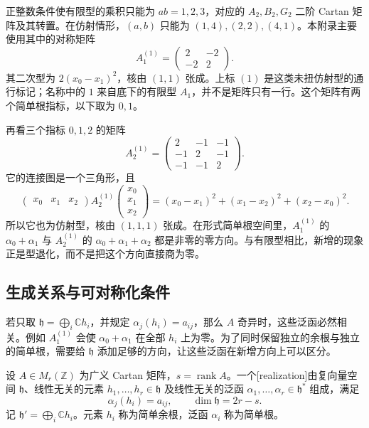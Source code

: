 正整数条件使有限型的乘积只能为 \(ab=1,2,3\)，对应的 \(A_2,B_2,G_2\) 二阶 Cartan 矩阵及其转置。在仿射情形，\((a,b)\) 只能为 \((1,4),(2,2),(4,1)\)。本附录主要使用其中的对称矩阵
\[
	A_1^{(1)}=\begin{pmatrix}2&-2\\-2&2\end{pmatrix}.
\]
其二次型为 \(2(x_0-x_1)^2\)，核由 \((1,1)\) 张成。上标 \((1)\) 是这类未扭仿射型的通行标记；名称中的 \(1\) 来自底下的有限型 \(A_1\)，并不是矩阵只有一行。这个矩阵有两个简单根指标，以下取为 \(0,1\)。

\ProseParagraphBreak

再看三个指标 \(0,1,2\) 的矩阵
\[
	A_2^{(1)}=\begin{pmatrix}2&-1&-1\\-1&2&-1\\-1&-1&2\end{pmatrix}.
\]
它的连接图是一个三角形，且
\[
	\begin{pmatrix}x_0&x_1&x_2\end{pmatrix}A_2^{(1)}
	\begin{pmatrix}x_0\\x_1\\x_2\end{pmatrix}
	=(x_0-x_1)^2+(x_1-x_2)^2+(x_2-x_0)^2.
\]
所以它也为仿射型，核由 \((1,1,1)\) 张成。在形式简单根空间里，\(A_1^{(1)}\) 的 \(\alpha_0+\alpha_1\) 与 \(A_2^{(1)}\) 的 \(\alpha_0+\alpha_1+\alpha_2\) 都是非零的零方向。与有限型相比，新增的现象正是型退化，而不是把这个方向直接商为零。

\subsection{生成关系与可对称化条件}
\label{b5:subsec:G01:03}

若只取 \(\mathfrak h=\bigoplus_i\mathbb Ch_i\)，并规定 \(\alpha_j(h_i)=a_{ij}\)，那么 \(A\) 奇异时，这些泛函必然相关。例如 \(A_1^{(1)}\) 会使 \(\alpha_0+\alpha_1\) 在全部 \(h_i\) 上为零。为了同时保留独立的余根与独立的简单根，需要给 \(\mathfrak h\) 添加足够的方向，让这些泛函在新增方向上可以区分。

\begin{definition}\label{b5:def:G-realization}
	设 \(A\in M_r(\mathbb Z)\) 为广义 Cartan 矩阵，\(s=\operatorname{rank}A\)。一个[realization]由复向量空间 \(\mathfrak h\)、线性无关的元素 \(h_1,\ldots,h_r\in\mathfrak h\) 及线性无关的泛函 \(\alpha_1,\ldots,\alpha_r\in\mathfrak h^*\) 组成，满足
	\[
		\alpha_j(h_i)=a_{ij},\qquad \dim\mathfrak h=2r-s.
	\]
	记 \(\mathfrak h'=\bigoplus_i\mathbb Ch_i\)。元素 \(h_i\) 称为简单余根，泛函 \(\alpha_i\) 称为简单根。
\end{definition}

